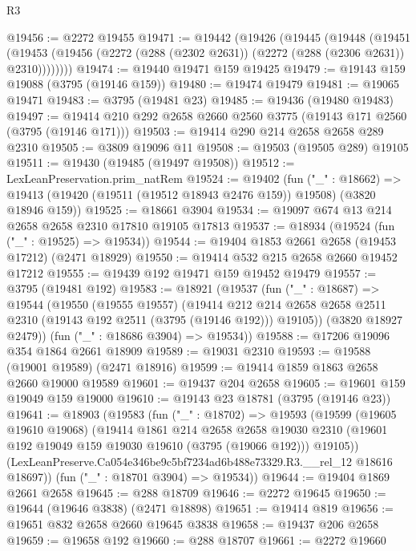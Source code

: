 \begin{lexlean}{R3}
\begin{coremodule}
@19456 := @2272 @19455
@19471 := @19442
    (@19426
      (@19445
        (@19448
          (@19451
            (@19453 (@19456 (@2272 (@288 (@2302 @2631)) (@2272 (@288 (@2306 @2631)) @2310))))))))
@19474 := @19440 @19471 @159 @19425
@19479 := @19143 @159 @19088 (@3795 (@19146 @159))
@19480 := @19474 @19479
@19481 := @19065 @19471
@19483 := @3795 (@19481 @23)
@19485 := @19436 (@19480 @19483)
@19497 := @19414 @210 @292 @2658 @2660 @2560 @3775 (@19143 @171 @2560 (@3795 (@19146 @171)))
@19503 := @19414 @290 @214 @2658 @2658 @289 @2310
@19505 := @3809 @19096 @11
@19508 := @19503 (@19505 @289) @19105
@19511 := @19430 (@19485 (@19497 @19508))
@19512 := LexLeanPreservation.prim_natRem
@19524 := @19402
    (fun ("_" : @18662) =>
    @19413 (@19420 (@19511 (@19512 @18943 @2476 @159)) @19508) (@3820 @18946 @159))
@19525 := @18661 @3904
@19534 := @19097 @674 @13 @214 @2658 @2658 @2310 @17810 @19105 @17813
@19537 := @18934 (@19524 (fun ("_" : @19525) => @19534))
@19544 := @19404 @1853 @2661 @2658 (@19453 @17212) (@2471 @18929)
@19550 := @19414 @532 @215 @2658 @2660 @19452 @17212
@19555 := @19439 @192 @19471 @159 @19452 @19479
@19557 := @3795 (@19481 @192)
@19583 := @18921
    (@19537
      (fun ("_" : @18687) =>
      @19544
        (@19550
          (@19555 @19557)
          (@19414
            @212
            @214
            @2658
            @2658
            @2511
            @2310
            (@19143 @192 @2511 (@3795 (@19146 @192)))
            @19105))
        (@3820 @18927 @2479))
      (fun ("_" : @18686 @3904) => @19534))
@19588 := @17206 @19096 @354 @1864 @2661 @18909
@19589 := @19031 @2310
@19593 := @19588 (@19001 @19589) (@2471 @18916)
@19599 := @19414 @1859 @1863 @2658 @2660 @19000 @19589
@19601 := @19437 @204 @2658
@19605 := @19601 @159 @19049 @159 @19000
@19610 := @19143 @23 @18781 (@3795 (@19146 @23))
@19641 := @18903
    (@19583
      (fun ("_" : @18702) =>
      @19593
        (@19599
          (@19605 @19610 @19068)
          (@19414
            @1861
            @214
            @2658
            @2658
            @19030
            @2310
            (@19601 @192 @19049 @159 @19030 @19610 (@3795 (@19066 @192)))
            @19105))
        (LexLeanPreserve.Ca054e346be9c5bf7234ad6b488e73329.R3.__rel_12 @18616 @18697))
      (fun ("_" : @18701 @3904) => @19534))
@19644 := @19404 @1869 @2661 @2658
@19645 := @288 @18709
@19646 := @2272 @19645
@19650 := @19644 (@19646 @3838) (@2471 @18898)
@19651 := @19414 @819
@19656 := @19651 @832 @2658 @2660 @19645 @3838
@19658 := @19437 @206 @2658
@19659 := @19658 @192
@19660 := @288 @18707
@19661 := @2272 @19660

\end{coremodule}
\end{lexlean}
